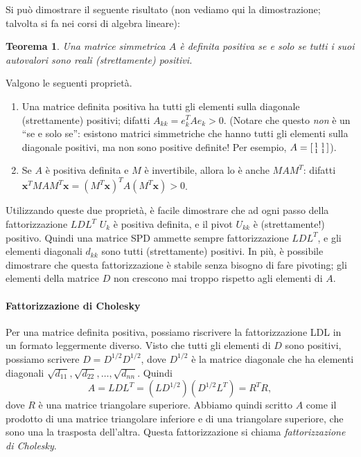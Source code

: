 \documentclass[a4paper]{report}
\newtheorem{theorem}{Teorema}[chapter]
\theoremstyle{definiton}
\theoremstyle{remark}
\begin{document}
Si può dimostrare il seguente risultato (non vediamo qui la dimostrazione; talvolta si fa nei corsi di algebra lineare):
\begin{theorem}
Una matrice simmetrica $A$ è definita positiva se e solo se tutti i suoi autovalori sono reali (strettamente) positivi. 
\end{theorem}
Valgono le seguenti proprietà.
\begin{enumerate}
    \item Una matrice definita positiva ha tutti gli elementi sulla diagonale (strettamente) positivi; difatti $A_{kk} = e_k^T A e_k > 0$. (Notare che questo \emph{non} è un ``se e solo se'': esistono matrici simmetriche che hanno tutti gli elementi sulla diagonale positivi, ma non sono positive definite! Per esempio, $A = \begin{bsmallmatrix}
        1 & 1\\ 1 & 1
    \end{bsmallmatrix}$).
    \item Se $A$ è positiva definita e $M$ è invertibile, allora lo è anche $MAM^T$: difatti $\mathbf{x}^T MAM^T \mathbf{x} = (M^T\mathbf{x})^T A (M^T\mathbf{x}) > 0$.
\end{enumerate}
Utilizzando queste due proprietà, è facile dimostrare che ad ogni passo della fattorizzazione $LDL^T$ $U_k$ è positiva definita, e il pivot $U_{kk}$ è (strettamente!) positivo. Quindi una matrice SPD ammette sempre fattorizzazione $LDL^T$, e gli elementi diagonali $d_{kk}$ sono tutti (strettamente) positivi. In più, è possibile dimostrare che questa fattorizzazione è stabile senza bisogno di fare pivoting; gli elementi della matrice $D$ non crescono mai troppo rispetto agli elementi di $A$.

\paragraph{Fattorizzazione di Cholesky}
Per una matrice definita positiva, possiamo riscrivere la fattorizzazione LDL in un formato leggermente diverso. Visto che tutti gli elementi di $D$ sono positivi, possiamo scrivere $D = D^{1/2} D^{1/2}$, dove $D^{1/2}$ è la matrice diagonale che ha elementi diagonali $\sqrt{d_{11}}, \sqrt{d_{22}}, \dots, \sqrt{d_{nn}}$. Quindi
\[
A = LDL^T = (LD^{1/2})(D^{1/2}L^T) = R^TR,
\]
dove $R$ è una matrice triangolare superiore. Abbiamo quindi scritto $A$ come il prodotto di una matrice triangolare inferiore e di una triangolare superiore, che sono una la trasposta dell'altra. Questa fattorizzazione si chiama \emph{fattorizzazione di Cholesky}. 
\end{document}

